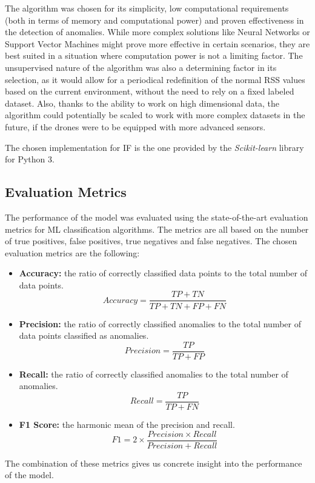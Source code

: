 \documentclass[futureinternet,article,submit,pdftex,moreauthors]{Definitions/mdpi}
\begin{document}
The algorithm was chosen for its simplicity, low computational requirements (both in terms of memory and computational power) and proven effectiveness in the detection of anomalies\cite{IsolationForestLiu}. While more complex solutions like Neural Networks or Support Vector Machines might prove more effective in certain scenarios, they are best suited in a situation where computation power is not a limiting factor.
The unsupervised nature of the algorithm was also a determining factor in its selection, as it would allow for a periodical redefinition of the normal RSS values based on the current environment, without the need to rely on a fixed labeled dataset. 
Also, thanks to the ability to work on high dimensional data, the algorithm could potentially be scaled to work with more complex datasets in the future, if the drones were to be equipped with more advanced sensors.

The chosen implementation for IF is the one provided by the \textit{Scikit-learn} library \cite{IsolationForestScikitLearn} for Python 3. 

\subsection{Evaluation Metrics}\label{EvaluationMetrics}

The performance of the model was evaluated using the state-of-the-art evaluation metrics for ML classification algorithms. The metrics are all based on the number of true positives, false positives, true negatives and false negatives.
The chosen evaluation metrics are the following: 

\begin{itemize}
	\item \textbf{Accuracy:} the ratio of correctly classified data points to the total number of data points.
	\begin{equation}
		\label{eq:accuracy}
	  Accuracy = \frac{TP + TN}{TP + TN + FP + FN}
	\end{equation}
	\item \textbf{Precision:} the ratio of correctly classified anomalies to the total number of data points classified as anomalies.
	\begin{equation}
		\label{eq:precision}
	  Precision = \frac{TP}{TP + FP}
	\end{equation}
	\item \textbf{Recall:} the ratio of correctly classified anomalies to the total number of anomalies.
	\begin{equation}
		\label{eq:recall}
	  Recall = \frac{TP}{TP + FN}
	\end{equation}
	\item \textbf{F1 Score:} the harmonic mean of the precision and recall.
	\begin{equation}
		\label{eq:f1}
	  F1 = 2 \times \frac{Precision \times Recall}{Precision + Recall}
	\end{equation}
\end{itemize}
The combination of these metrics gives us concrete insight into the performance of the model. 
\end{document}
